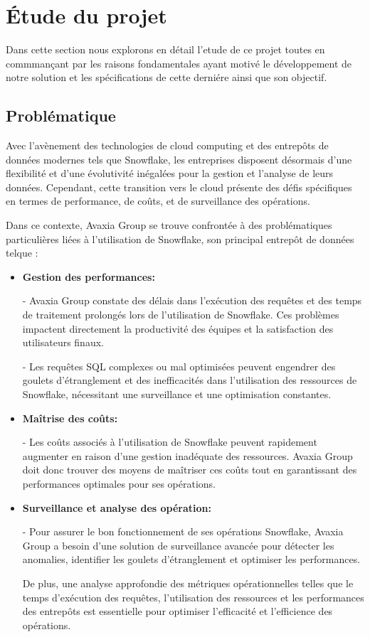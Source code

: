 \section{\'Etude du projet}
\par Dans cette section nous explorons en détail  l'etude de ce projet toutes en commmançant par les raisons fondamentales ayant motivé le développement de notre solution et les spécifications de cette derniére ainsi que son objectif.
\subsection{Problématique}
\par Avec l'avènement des technologies de cloud computing et des entrepôts de données modernes tels que Snowflake, les entreprises disposent désormais d'une flexibilité et d'une évolutivité inégalées pour la gestion et l'analyse de leurs données. 
Cependant, cette transition vers le cloud présente des défis spécifiques en termes de performance, de coûts, et de surveillance des opérations. 
\par Dans ce contexte, Avaxia Group se trouve confrontée à des problématiques particulières liées à l'utilisation de Snowflake, son principal entrepôt de données telque : 
\begin{itemize}
    \item \textbf{Gestion des performances: } \par - Avaxia Group constate des délais dans l'exécution des requêtes et des temps de traitement prolongés lors de l'utilisation de Snowflake. Ces problèmes impactent directement la productivité des équipes et la satisfaction des utilisateurs finaux.
    \par - Les requêtes SQL complexes ou mal optimisées peuvent engendrer des goulets d'étranglement et des inefficacités dans l'utilisation des ressources de Snowflake, nécessitant une surveillance et une optimisation constantes.
    \item \textbf{Maîtrise des coûts:} \par - Les coûts associés à l'utilisation de Snowflake peuvent rapidement augmenter en raison d'une gestion inadéquate des ressources. Avaxia Group doit donc trouver des moyens de maîtriser ces coûts tout en garantissant des performances optimales pour ses opérations.
    \item \textbf{Surveillance et analyse des opération:} \par - Pour assurer le bon fonctionnement de ses opérations Snowflake, Avaxia Group a besoin d'une solution de surveillance avancée pour détecter les anomalies, identifier les goulets d'étranglement et optimiser les performances.
    \par De plus, une analyse approfondie des métriques opérationnelles telles que le temps d'exécution des requêtes, l'utilisation des ressources et les performances des entrepôts est essentielle pour optimiser l'efficacité et l'efficience des opérations.
\end{itemize}

